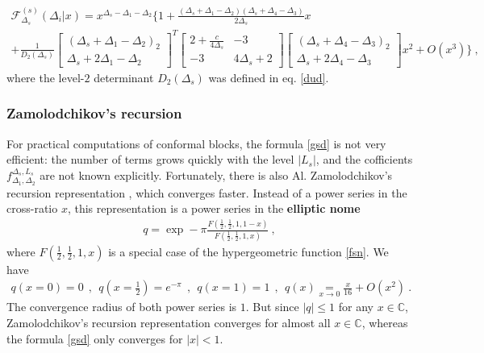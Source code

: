 \documentclass[12pt, a4paper, notitlepage, twoside]{report}
\numberwithin{equation}{section}
\theoremstyle{break}
\begin{document}
\begin{multline}
 \mathcal{F}^{(s)}_{\Delta_s}(\Delta_i|x) 
= x^{\Delta_s - \Delta_1 - \Delta_2}\Bigg\{ 1 
+ \frac{(\Delta_s+\Delta_1-\Delta_2)(\Delta_s+\Delta_4-\Delta_3)}{2\Delta_s} x  
\\
+ \frac{1}{D_2(\Delta_s)}
\begin{bmatrix} (\Delta_s+\Delta_1-\Delta_2)_2 \\ \Delta_s+2\Delta_1-\Delta_2 \end{bmatrix}^T
\begin{bmatrix} 2+\frac{c}{4\Delta_s} & -3 \\ -3 & 4\Delta_s+2 \end{bmatrix}
\begin{bmatrix} (\Delta_s+\Delta_4-\Delta_3)_2 \\ \Delta_s+2\Delta_4-\Delta_3 \end{bmatrix}
 x^2 + O(x^3)\Bigg\}\ ,
\end{multline}
where the level-$2$ determinant $D_2(\Delta_s)$ was defined in eq. \eqref{dud}.


\subsubsection{Zamolodchikov's recursion}

For practical computations of conformal blocks, the formula \eqref{gsd} is not very efficient: the number of terms grows quickly with the level $|L_s|$, and the cofficients $f_{\Delta_1,\Delta_2}^{\Delta_s,L_s}$ are not known explicitly.
Fortunately, there is also Al.
Zamolodchikov's recursion representation \cite{zz90}, which converges faster.
Instead of a power series in the cross-ratio $x$, this representation is a power series in the \textbf{elliptic nome}
\begin{align}
 q = \exp -\pi \frac{F(\frac12,\frac12,1,1-x)}{F(\frac12,\frac12,1,x)}  \ , 
\end{align}
where $F(\frac12,\frac12,1,x)$ is a special case of the hypergeometric function \eqref{fsn}. 
We have 
\begin{align}
 q(x=0)=0 \ \ , \ \ q(x=\tfrac12) = e^{-\pi} \ \ , \ \ q(x=1)=1 \ \ , \ \ q(x)\underset{x\to 0}{=} \frac{x}{16} +O(x^2)\ .
\end{align}
The convergence radius of both power series is $1$.
But since $|q|\leq 1$ for any $x\in\mathbb{C}$, Zamolodchikov's recursion representation converges for almost all $x\in \mathbb{C}$, whereas the formula \eqref{gsd} only converges for $|x|<1$.
\end{document}
